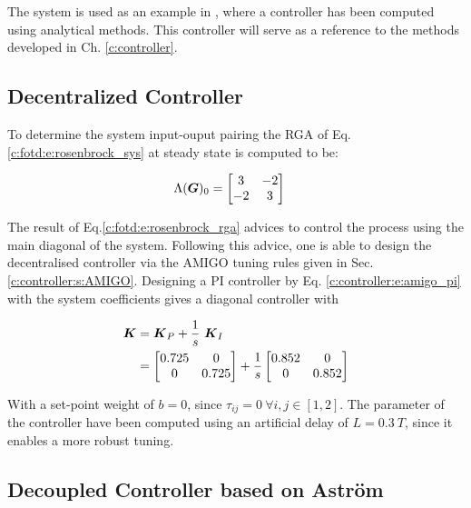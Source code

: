 The system is used as an example in \cite{Astrom2001a}, where a controller has been computed using analytical methods. This controller will serve as a reference to the methods developed in Ch. \ref{c:controller}. 

\subsection{Decentralized Controller}%
\label{c:fotd:s:rosebrock:sub:decentral}

To determine the system input-ouput pairing the RGA of Eq.\ref{c:fotd:e:rosenbrock_sys} at steady state is computed to be:

\begin{align}
\begin{split}
\Lambda(\mbox{\boldmath$G$})_0 &= \begin{bmatrix}
3 & -2 \\
-2 & 3
\end{bmatrix} 
\end{split}
\label{c:fotd:e:rosenbrock_rga}
\end{align}

The result of Eq.\ref{c:fotd:e:rosenbrock_rga} advices to control the process using the main diagonal of the system. Following this advice, one is able to design the decentralised controller via the AMIGO tuning rules given in Sec. \ref{c:controller:s:AMIGO}. Designing a PI controller by Eq. \ref{c:controller:e:amigo_pi} with the system coefficients gives a diagonal controller with

\begin{align}
\mbox{\boldmath$K$} &= \mbox{\boldmath$K$}_P + \frac{1}{s}~ \mbox{\boldmath$K$}_I\\
&= \begin{bmatrix}
0.725 & 0 \\
0 & 0.725
\end{bmatrix}
+ \frac{1}{s}\begin{bmatrix}
0.852 & 0 \\
0 & 0.852
\end{bmatrix}
\end{align}

With a set-point weight of $ b = 0 $, since $\tau_{ij} = 0 ~\forall i,j \in [1,2]$. The parameter of the controller have been computed using an artificial delay of $L = 0.3~T$, since it enables a more robust tuning.

\subsection{Decoupled Controller based on Astr\"om}%
\label{c:fotd:s:rosebrock:sub:astrom}

